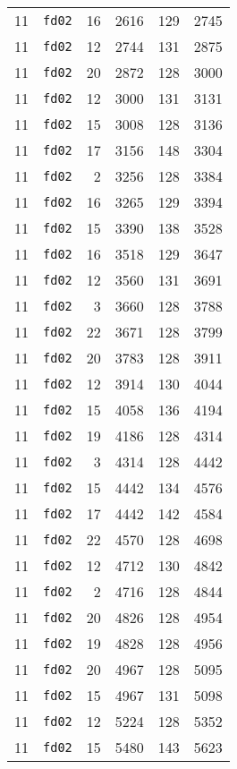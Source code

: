 \documentclass{article}
\begin{document}
\begin{table}[h!]
\begin{tabular}{llrrrl}
    11 & \texttt{fd02} & 16 & 2616 & 129 & 2745 \\
    11 & \texttt{fd02} & 12 & 2744 & 131 & 2875 \\
    11 & \texttt{fd02} & 20 & 2872 & 128 & 3000 \\
    11 & \texttt{fd02} & 12 & 3000 & 131 & 3131 \\
    11 & \texttt{fd02} & 15 & 3008 & 128 & 3136 \\
    11 & \texttt{fd02} & 17 & 3156 & 148 & 3304 \\
    11 & \texttt{fd02} & 2 & 3256 & 128 & 3384 \\
    11 & \texttt{fd02} & 16 & 3265 & 129 & 3394 \\
    11 & \texttt{fd02} & 15 & 3390 & 138 & 3528 \\
    11 & \texttt{fd02} & 16 & 3518 & 129 & 3647 \\
    11 & \texttt{fd02} & 12 & 3560 & 131 & 3691 \\
    11 & \texttt{fd02} & 3 & 3660 & 128 & 3788 \\
    11 & \texttt{fd02} & 22 & 3671 & 128 & 3799 \\
    11 & \texttt{fd02} & 20 & 3783 & 128 & 3911 \\
    11 & \texttt{fd02} & 12 & 3914 & 130 & 4044 \\
    11 & \texttt{fd02} & 15 & 4058 & 136 & 4194 \\
    11 & \texttt{fd02} & 19 & 4186 & 128 & 4314 \\
    11 & \texttt{fd02} & 3 & 4314 & 128 & 4442 \\
    11 & \texttt{fd02} & 15 & 4442 & 134 & 4576 \\
    11 & \texttt{fd02} & 17 & 4442 & 142 & 4584 \\
    11 & \texttt{fd02} & 22 & 4570 & 128 & 4698 \\
    11 & \texttt{fd02} & 12 & 4712 & 130 & 4842 \\
    11 & \texttt{fd02} & 2 & 4716 & 128 & 4844 \\
    11 & \texttt{fd02} & 20 & 4826 & 128 & 4954 \\
    11 & \texttt{fd02} & 19 & 4828 & 128 & 4956 \\
    11 & \texttt{fd02} & 20 & 4967 & 128 & 5095 \\
    11 & \texttt{fd02} & 15 & 4967 & 131 & 5098 \\
    11 & \texttt{fd02} & 12 & 5224 & 128 & 5352 \\
    11 & \texttt{fd02} & 15 & 5480 & 143 & 5623 \\

\end{tabular}
\end{table}
\end{document}
